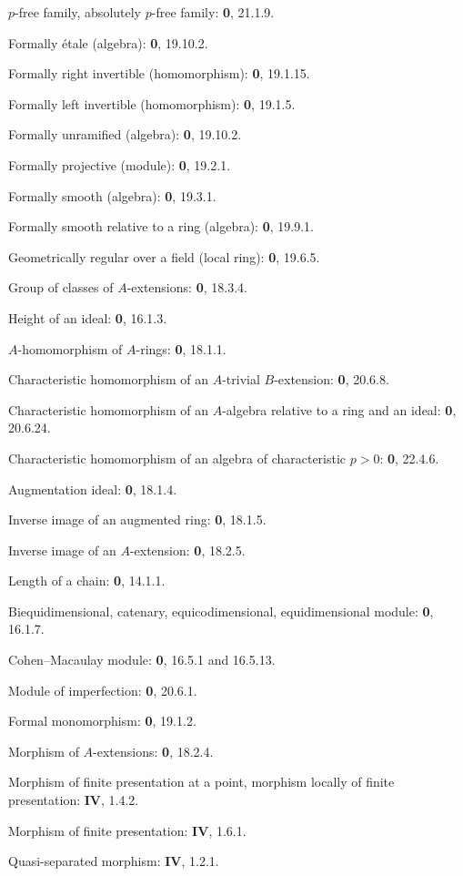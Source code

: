 $p$-free family, absolutely $p$-free family: \textbf{0}, 21.1.9.\par
Formally étale (algebra): \textbf{0}, 19.10.2.\par
Formally right invertible (homomorphism): \textbf{0}, 19.1.15.\par
Formally left invertible (homomorphism): \textbf{0}, 19.1.5.\par
Formally unramified (algebra): \textbf{0}, 19.10.2.\par
Formally projective (module): \textbf{0}, 19.2.1.\par
Formally smooth (algebra): \textbf{0}, 19.3.1.\par
Formally smooth relative to a ring (algebra): \textbf{0}, 19.9.1.\par

Geometrically regular over a field (local ring): \textbf{0}, 19.6.5.\par
Group of classes of $A$-extensions: \textbf{0}, 18.3.4.\par

Height of an ideal: \textbf{0}, 16.1.3.\par
$A$-homomorphism of $A$-rings: \textbf{0}, 18.1.1.\par
Characteristic homomorphism of an $A$-trivial $B$-extension: \textbf{0}, 20.6.8.\par
Characteristic homomorphism of an $A$-algebra relative to a ring and an ideal: \textbf{0}, 20.6.24.\par
Characteristic homomorphism of an algebra of characteristic $p>0$: \textbf{0}, 22.4.6.\par

Augmentation ideal: \textbf{0}, 18.1.4.\par
Inverse image of an augmented ring: \textbf{0}, 18.1.5.\par
Inverse image of an $A$-extension: \textbf{0}, 18.2.5.\par

Length of a chain: \textbf{0}, 14.1.1.\par

Biequidimensional, catenary, equicodimensional, equidimensional module: \textbf{0}, 16.1.7.\par
Cohen--Macaulay module: \textbf{0}, 16.5.1 and 16.5.13.\par
Module of imperfection: \textbf{0}, 20.6.1.\par
Formal monomorphism: \textbf{0}, 19.1.2.\par
Morphism of $A$-extensions: \textbf{0}, 18.2.4.\par
Morphism of finite presentation at a point, morphism locally of finite presentation: \textbf{IV}, 1.4.2.\par
Morphism of finite presentation: \textbf{IV}, 1.6.1.\par
Quasi-separated morphism: \textbf{IV}, 1.2.1.\par

